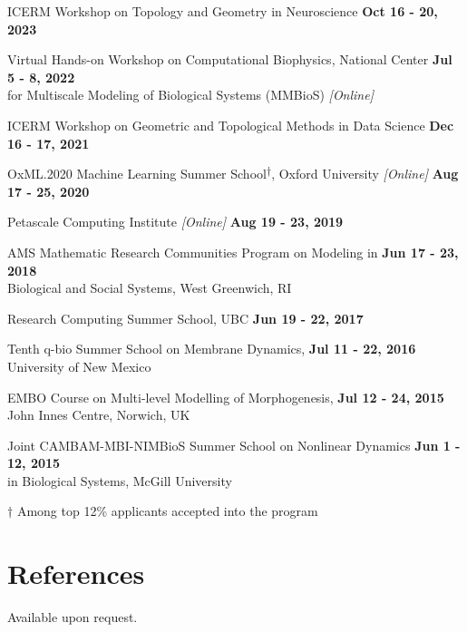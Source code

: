 \documentclass[margin,line]{res}
\newenvironment{list1}{
  \begin{list}{\ding{113}}{
      \setlength{\itemsep}{0in}
      \setlength{\parsep}{0in} \setlength{\parskip}{0in}
      \setlength{\topsep}{0in} \setlength{\partopsep}{0in}
      \setlength{\leftmargin}{0.17in}}}{\end{list}}
\begin{document}
\begin{resume}
\begin{list1}
\itemindent=-13pt
\setlength\itemsep{0.75em}
\item[] ICERM Workshop on Topology and Geometry in Neuroscience \hfill {\bf \small Oct 16 - 20, 2023}
\item[] Virtual Hands-on Workshop on Computational Biophysics, National Center \hfill {\bf \small Jul 5 - 8, 2022} \\ 
\hspace*{-1.5em} for Multiscale Modeling of Biological Systems (MMBioS) \textit{[Online]} 
\item[] ICERM Workshop on Geometric and Topological Methods in Data Science \hfill {\bf \small Dec 16 - 17, 2021}
\item[] OxML.2020 Machine Learning Summer School\textsuperscript{$\dagger$}, Oxford University \textit{[Online]} \hfill {\bf \small Aug 17 - 25, 2020}
\item[] Petascale Computing Institute \textit{[Online]} \hfill {\bf \small Aug 19 - 23, 2019}
\item[] AMS Mathematic Research Communities Program on Modeling in \hfill {\bf \small Jun 17 - 23, 2018} \\
\hspace*{-1.5em} Biological and Social Systems, West Greenwich, RI 
\item[] Research Computing Summer School, UBC \hfill {\bf \small Jun 19 - 22, 2017}
\item[] Tenth q-bio Summer School on Membrane Dynamics, \hfill {\bf \small Jul 11 - 22, 2016} \\
\hspace*{-1.5em} University of New Mexico
\item[] EMBO Course on Multi-level Modelling of Morphogenesis, \hfill {\bf \small Jul 12 - 24, 2015} \\ 
\hspace*{-1.5em} John Innes Centre, Norwich, UK 
\item[] Joint CAMBAM-MBI-NIMBioS Summer School on Nonlinear Dynamics \hfill {\bf \small Jun 1 - 12, 2015} \\ 
\hspace*{-1.5em} in Biological Systems, McGill University 
\item[] {\small $\dagger$ Among top 12\% applicants accepted into the program}
\end{list1}

\vspace*{.2cm}
\section{\sc References} Available upon request.


\end{resume}
\end{document}
